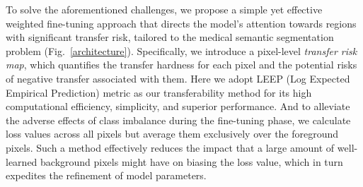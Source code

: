 To solve the aforementioned challenges, we propose a simple yet effective weighted fine-tuning approach that directs the model's attention towards regions with significant transfer risk, tailored to the medical semantic segmentation problem (Fig.~\ref{architecture}). Specifically, we introduce a pixel-level {\it transfer risk map}, which quantifies the transfer hardness for each pixel and the potential risks of negative transfer associated with them. Here we adopt LEEP (Log Expected Empirical Prediction)\cite{leep} metric as our transferability method for its high computational efficiency, simplicity, and superior performance\cite{10222912}. And to alleviate the adverse effects of class imbalance during the fine-tuning phase, we calculate loss values across all pixels but average them exclusively over the foreground pixels. Such a method effectively reduces the impact that a large amount of well-learned background pixels might have on biasing the loss value, which in turn expedites the refinement of model parameters. 



